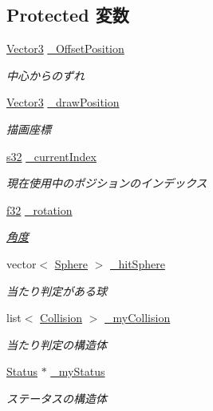 \subsection*{Protected 変数}
\begin{DoxyCompactItemize}
\item 
\hyperlink{struct_vector3}{Vector3} \hyperlink{class_castle_wall_a2f7b20a81e21b11edf72a8b1994779fa}{\-\_\-\-Offset\-Position}
\begin{DoxyCompactList}\small\item\em 中心からのずれ \end{DoxyCompactList}\item 
\hyperlink{struct_vector3}{Vector3} \hyperlink{class_castle_wall_a4c7b392af8d00109092f17cbe169b8e8}{\-\_\-draw\-Position}
\begin{DoxyCompactList}\small\item\em 描画座標 \end{DoxyCompactList}\item 
\hyperlink{_main_8h_a0ce6887c26c1c49ad3be5710dd42bfd6}{s32} \hyperlink{class_castle_wall_a6e4d2f234838b7044d0fa3db87a5e53d}{\-\_\-current\-Index}
\begin{DoxyCompactList}\small\item\em 現在使用中のポジションのインデックス \end{DoxyCompactList}\item 
\hyperlink{_main_8h_a5f6906312a689f27d70e9d086649d3fd}{f32} \hyperlink{class_castle_wall_a4c821b732dd44bd8378f6f4b54187b81}{\-\_\-rotation}
\begin{DoxyCompactList}\small\item\em \hyperlink{class_xE8_xA7_x92_xE5_xBA_xA6}{角度} \end{DoxyCompactList}\item 
vector$<$ \hyperlink{struct_sphere}{Sphere} $>$ \hyperlink{class_castle_wall_a3223b9046a9d01b1fd952d2ecc1a8c40}{\-\_\-hit\-Sphere}
\begin{DoxyCompactList}\small\item\em 当たり判定がある球 \end{DoxyCompactList}\item 
list$<$ \hyperlink{class_collision}{Collision} $>$ \hyperlink{class_castle_wall_ab84bd40d05f9cb90506602216c0ac3d2}{\-\_\-my\-Collision}
\begin{DoxyCompactList}\small\item\em 当たり判定の構造体 \end{DoxyCompactList}\item 
\hyperlink{struct_status}{Status} $\ast$ \hyperlink{class_castle_wall_abc6fe65d816aa28f713ed6a5cd3fc2b2}{\-\_\-my\-Status}
\begin{DoxyCompactList}\small\item\em ステータスの構造体 \end{DoxyCompactList}\end{DoxyCompactItemize}
